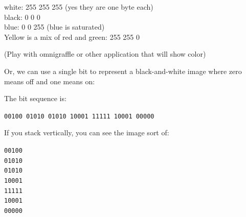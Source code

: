 \begin{fullwidth}
white: 255 255 255  (yes they are one byte each) \\
black: 0 0 0\\
blue: 0 0 255 (blue is saturated)\\
Yellow is a mix of red and green: 255 255 0

(Play with omnigraffle or other application that will show color)

\noindent Or, we can use a single bit to represent a black-and-white image where zero means off and one means on:


\noindent The bit sequence is:

{\tt 00100 01010 01010 10001 11111 10001 00000}

\noindent If you stack vertically, you can see the image sort of:

{\tt 00100\\
     01010 \\
     01010 \\
     10001 \\
     11111 \\
     10001 \\
     00000}


\end{fullwidth}
